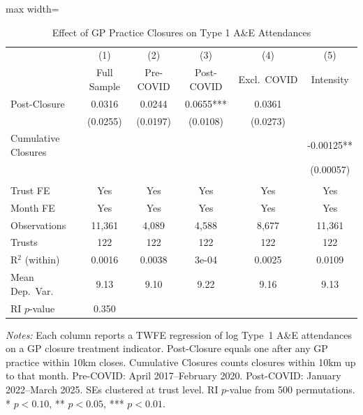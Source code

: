 \begin{table}[htbp]
\centering
\caption{Effect of GP Practice Closures on Type 1 A\&E Attendances}
\label{tab:main}
\begin{adjustbox}{max width=\textwidth}
\begin{tabular}{lccccc}
\hline\hline
 & (1) & (2) & (3) & (4) & (5) \\
 & Full Sample & Pre-COVID & Post-COVID & Excl.\ COVID & Intensity \\
\hline
Post-Closure & 0.0316 & 0.0244 & 0.0655*** & 0.0361 & \\
 & (0.0255) & (0.0197) & (0.0108) & (0.0273) & \\
Cumulative Closures & & & & & -0.00125** \\
 & & & & & (0.00057) \\
\\
Trust FE & Yes & Yes & Yes & Yes & Yes \\
Month FE & Yes & Yes & Yes & Yes & Yes \\
Observations & 11,361 & 4,089 & 4,588 & 8,677 & 11,361 \\
Trusts & 122 & 122 & 122 & 122 & 122 \\
R$^2$ (within) & 0.0016 & 0.0038 & 3e-04 & 0.0025 & 0.0109 \\
Mean Dep.\ Var.\ & 9.13 & 9.10 & 9.22 & 9.16 & 9.13 \\
RI $p$-value & 0.350 & & & & \\
\hline\hline
\end{tabular}
\end{adjustbox}
\begin{tablenotes}[flushleft]
\footnotesize
\item \textit{Notes:} Each column reports a TWFE regression of log Type~1 A\&E attendances on a GP closure treatment indicator. Post-Closure equals one after any GP practice within 10km closes. Cumulative Closures counts closures within 10km up to that month. Pre-COVID: April 2017--February 2020. Post-COVID: January 2022--March 2025. SEs clustered at trust level. RI $p$-value from 500 permutations. * $p < 0.10$, ** $p < 0.05$, *** $p < 0.01$.
\end{tablenotes}
\end{table}
